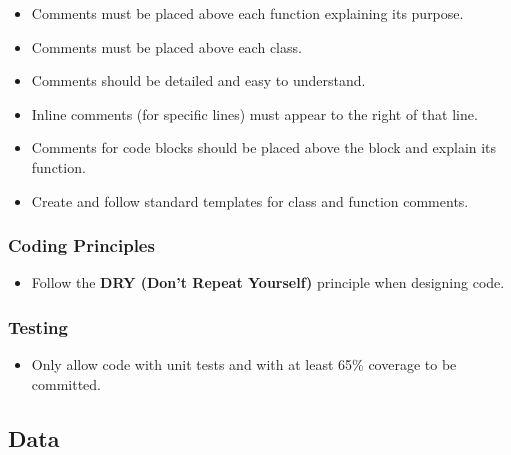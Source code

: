 \documentclass{article}
\begin{document}
\begin{itemize}
    \item Comments must be placed above each function explaining its purpose.
    \item Comments must be placed above each class.
    \item Comments should be detailed and easy to understand.
    \item Inline comments (for specific lines) must appear to the right of that line.
    \item Comments for code blocks should be placed above the block and explain its function.
    \item Create and follow standard templates for class and function comments.
\end{itemize}

\subsubsection{Coding Principles}

\begin{itemize}
    \item Follow the \textbf{DRY (Don't Repeat Yourself)} principle when designing code.
\end{itemize}
\subsubsection{Testing}
    \begin{itemize}
    \item Only allow code with unit tests and with at least 65\% coverage to be committed.
\end{itemize}

\subsection{Data}
\end{document}
